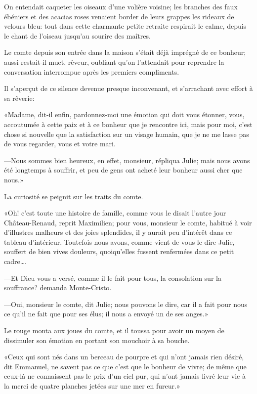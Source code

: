 On entendait caqueter les oiseaux d'une volière voisine; les branches des faux ébéniers et des acacias roses venaient border de leurs grappes les rideaux de velours bleu: tout dans cette charmante petite retraite respirait le calme, depuis le chant de l'oiseau jusqu'au sourire des maîtres. 

Le comte depuis son entrée dans la maison s'était déjà imprégné de ce bonheur; aussi restait-il muet, rêveur, oubliant qu'on l'attendait pour reprendre la conversation interrompue après les premiers compliments. 

Il s'aperçut de ce silence devenue presque inconvenant, et s'arrachant avec effort à sa rêverie: 

«Madame, dit-il enfin, pardonnez-moi une émotion qui doit vous étonner, vous, accoutumée à cette paix et à ce bonheur que je rencontre ici, mais pour moi, c'est chose si nouvelle que la satisfaction sur un visage humain, que je ne me lasse pas de vous regarder, vous et votre mari. 

—Nous sommes bien heureux, en effet, monsieur, répliqua Julie; mais nous avons été longtemps à souffrir, et peu de gens ont acheté leur bonheur aussi cher que nous.» 

La curiosité se peignit sur les traits du comte. 

«Oh! c'est toute une histoire de famille, comme vous le disait l'autre jour Château-Renaud, reprit Maximilien; pour vous, monsieur le comte, habitué à voir d'illustres malheurs et des joies splendides, il y aurait peu d'intérêt dans ce tableau d'intérieur. Toutefois nous avons, comme vient de vous le dire Julie, souffert de bien vives douleurs, quoiqu'elles fussent renfermées dans ce petit cadre\dots. 

—Et Dieu vous a versé, comme il le fait pour tous, la consolation sur la souffrance? demanda Monte-Cristo. 

—Oui, monsieur le comte, dit Julie; nous pouvons le dire, car il a fait pour nous ce qu'il ne fait que pour ses élus; il nous a envoyé un de ses anges.» 

Le rouge monta aux joues du comte, et il toussa pour avoir un moyen de dissimuler son émotion en portant son mouchoir à sa bouche. 

«Ceux qui sont nés dans un berceau de pourpre et qui n'ont jamais rien désiré, dit Emmanuel, ne savent pas ce que c'est que le bonheur de vivre; de même que ceux-là ne connaissent pas le prix d'un ciel pur, qui n'ont jamais livré leur vie à la merci de quatre planches jetées sur une mer en fureur.» 

